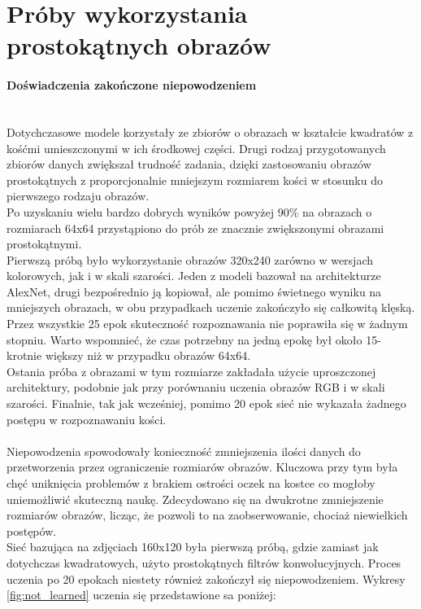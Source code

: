 \section{Próby wykorzystania prostokątnych obrazów}

\paragraph{Doświadczenia zakończone niepowodzeniem} \mbox{}\\
Dotychczasowe modele korzystały ze zbiorów o obrazach w kształcie kwadratów z kośćmi
umieszczonymi w ich środkowej części. Drugi rodzaj przygotowanych zbiorów danych zwiększał
trudność zadania, dzięki zastosowaniu obrazów prostokątnych z proporcjonalnie mniejszym
rozmiarem kości w stosunku do pierwszego rodzaju obrazów.\\
Po uzyskaniu wielu bardzo dobrych wyników powyżej 90\% na obrazach o rozmiarach 64x64
przystąpiono do prób ze znacznie zwiększonymi obrazami prostokątnymi.\\
Pierwszą próbą było wykorzystanie obrazów 320x240 zarówno w wersjach kolorowych, jak i w skali szarości.
Jeden z modeli bazował na architekturze AlexNet, drugi bezpośrednio
ją kopiował, ale pomimo świetnego wyniku na mniejszych obrazach, w obu przypadkach
uczenie zakończyło się całkowitą klęską. Przez wszystkie 25 epok skuteczność rozpoznawania
nie poprawiła się w żadnym stopniu. Warto wspomnieć, że czas potrzebny na
jedną epokę był około 15-krotnie większy niż w przypadku obrazów 64x64.\\
Ostania próba z obrazami w tym rozmiarze zakładała użycie uproszczonej architektury,
podobnie jak przy porównaniu uczenia obrazów RGB i w skali szarości. Finalnie, tak jak
wcześniej, pomimo 20 epok sieć nie wykazała żadnego postępu w rozpoznawaniu kości.\\\\
Niepowodzenia spowodowały konieczność zmniejszenia ilości danych do przetworzenia przez ograniczenie rozmiarów obrazów.
Kluczowa przy tym była chęć uniknięcia problemów z brakiem ostrości
oczek na kostce co mogłoby uniemożliwić skuteczną naukę. Zdecydowano się na dwukrotne
zmniejszenie rozmiarów obrazów, licząc, że pozwoli to na zaobserwowanie, chociaż niewielkich
postępów.\\
Sieć bazująca na zdjęciach 160x120 była pierwszą próbą, gdzie zamiast jak dotychczas
kwadratowych, użyto prostokątnych filtrów konwolucyjnych. Proces uczenia po 20 epokach
niestety również zakończył się niepowodzeniem. Wykresy \ref{fig:not_learned} uczenia się przedstawione sa poniżej: \newpage

